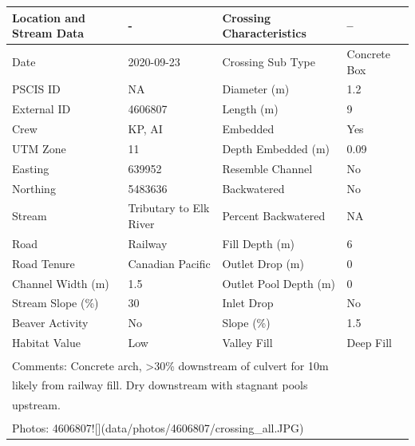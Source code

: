 \documentclass[
]{book}
\begin{document}
\begin{tabular}{l|l|l|l}
\hline
Location and Stream Data & - & Crossing Characteristics & --\\
\hline
Date & 2020-09-23 & Crossing Sub Type & Concrete Box\\
\hline
PSCIS ID & NA & Diameter (m) & 1.2\\
\hline
External ID & 4606807 & Length (m) & 9\\
\hline
Crew & KP, AI & Embedded & Yes\\
\hline
UTM Zone & 11 & Depth Embedded (m) & 0.09\\
\hline
Easting & 639952 & Resemble Channel & No\\
\hline
Northing & 5483636 & Backwatered & No\\
\hline
Stream & Tributary to Elk River & Percent Backwatered & NA\\
\hline
Road & Railway & Fill Depth (m) & 6\\
\hline
Road Tenure & Canadian Pacific & Outlet Drop (m) & 0\\
\hline
Channel Width (m) & 1.5 & Outlet Pool Depth (m) & 0\\
\hline
Stream Slope (\%) & 30 & Inlet Drop & No\\
\hline
Beaver Activity & No & Slope (\%) & 1.5\\
\hline
Habitat Value & Low & Valley Fill & Deep Fill\\
\hline
\multicolumn{4}{l}{\textsuperscript{} Comments: Concrete arch, >30\% downstream of culvert for 10m}\\
\multicolumn{4}{l}{likely from railway fill. Dry downstream with stagnant pools}\\
\multicolumn{4}{l}{upstream.}\\
\multicolumn{4}{l}{\textsuperscript{} Photos: 4606807![](data/photos/4606807/crossing\_all.JPG)}\\
\end{tabular}
\end{document}

